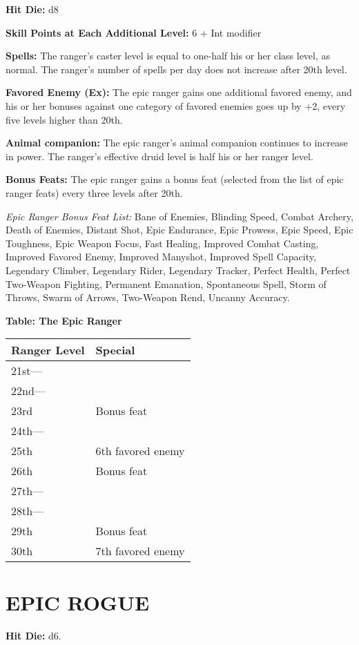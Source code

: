 \documentclass{article}
\begin{document}
\textbf{Hit Die:} d8

\textbf{Skill Points at Each Additional Level:} 6 + Int modifier

\textbf{Spells:} The ranger's caster level is equal to one-half his or her class 
level, as normal. The ranger's number of spells per day does not increase after 
20th level. 

\textbf{Favored Enemy (Ex):} The epic ranger gains one additional favored enemy, 
and his or her bonuses against one category of favored enemies goes up by +2, every 
five levels higher than 20th. 

\textbf{Animal companion: } The epic ranger's animal companion continues to increase 
in power.  The ranger's effective druid level is half his or her ranger level.

\textbf{Bonus Feats:} The epic ranger gains a bonus feat (selected from the list 
of epic ranger feats) every three levels after 20th. 

\textit{Epic Ranger Bonus Feat List: }Bane of Enemies, Blinding Speed, Combat Archery, 
Death of Enemies, Distant Shot, Epic Endurance, Epic Prowess, Epic Speed, Epic 
Toughness, Epic Weapon Focus, Fast Healing, Improved Combat Casting, Improved Favored 
Enemy, Improved Manyshot, Improved Spell Capacity, Legendary Climber, Legendary 
Rider, Legendary Tracker, Perfect Health, Perfect Two-Weapon Fighting, Permanent 
Emanation, Spontaneous Spell, Storm of Throws, Swarm of Arrows, Two-Weapon Rend, 
Uncanny Accuracy. 

\textbf{Table: The Epic Ranger }

\begin{tabular}{|>{\raggedright}p{38pt}|>{\raggedright}p{96pt}|}
\hline
R\textbf{anger Level} & S\textbf{pecial }\tabularnewline
\hline
21st--- &  \tabularnewline
\hline
22nd--- &  \tabularnewline
\hline
23rd & Bonus feat \tabularnewline
\hline
24th--- &  \tabularnewline
\hline
25th & 6th favored enemy \tabularnewline
\hline
26th & Bonus feat \tabularnewline
\hline
27th--- &  \tabularnewline
\hline
28th--- &  \tabularnewline
\hline
29th & Bonus feat \tabularnewline
\hline
30th & 7th favored enemy \tabularnewline
\hline
\end{tabular}

\vspace{24pt}
\section*{{\LARGE{}EPIC ROGUE }}

\textbf{Hit Die:} d6. 
\end{document}
